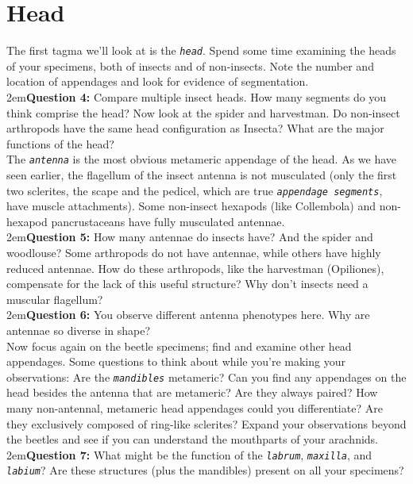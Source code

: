 \documentclass[letterpaper, 11pt]{article}
\newcommand{\latinword}[1]{\texttt{\itshape #1}}%
\begin{document}
\section{Head}
The first tagma we'll look at is the \latinword{head}. Spend some time examining the heads of your specimens, both of insects and of non-insects. Note the number and location of appendages and look for evidence of segmentation. \\

\hangindent2em\textbf{Question 4:} Compare multiple insect heads. How many segments do you think comprise the head? Now look at the spider and harvestman. Do non-insect arthropods have the same head configuration as Insecta? What are the major functions of the head? \\

\noindent{}The \latinword{antenna} is the most obvious metameric appendage of the head. As we have seen earlier, the flagellum of the insect antenna is not musculated (only the first two sclerites, the scape and the pedicel, which are true \latinword{appendage segments}, have muscle attachments). Some non-insect hexapods (like Collembola) and non-hexapod pancrustaceans have fully musculated antennae. \\

\hangindent2em\textbf{Question 5:} How many antennae do insects have? And the spider and woodlouse? Some arthropods do not have antennae, while others have highly reduced antennae. How do these arthropods, like the harvestman (Opiliones), compensate for the lack of this useful structure? Why don't insects need a muscular flagellum?\\

\hangindent2em\textbf{Question 6:} You observe different antenna phenotypes here. Why are antennae so diverse in shape?\\

\noindent{}Now focus again on the beetle specimens; find and examine other head appendages. Some questions to think about while you're making your observations: Are the \latinword{mandibles} metameric? Can you find any appendages on the head besides the antenna that are metameric? Are they always paired? How many non-antennal, metameric head appendages could you differentiate? Are they exclusively composed of ring-like sclerites? Expand your observations beyond the beetles and see if you can understand the mouthparts of your arachnids.\\

\hangindent2em\textbf{Question 7:} What might be the function of the \latinword{labrum}, \latinword{maxilla}, and \latinword{labium}? Are these structures (plus the mandibles) present on all your specimens?\\
\end{document}
